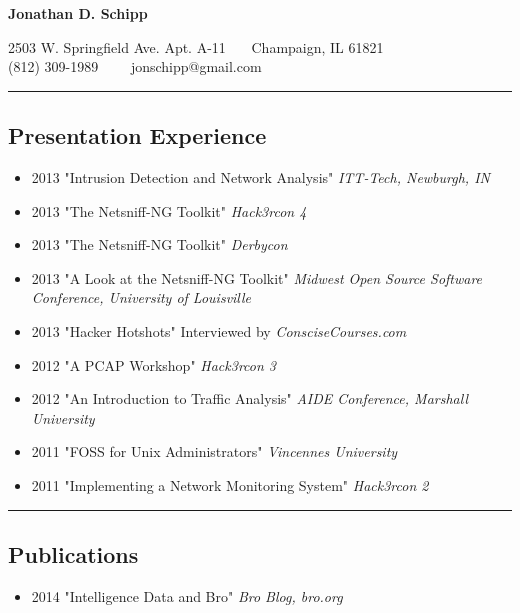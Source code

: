 \documentclass[10pt,letterpaper]{article}
\begin{document}
\newpage

\begin{center}
{\LARGE \textbf{Jonathan D. Schipp}}

2503 W. Springfield Ave. Apt. A-11\ \textbullet
\ \ Champaign, IL 61821
\\
(812) 309-1989\ \ \textbullet
\ \ jonschipp@gmail.com
\end{center}

\hrule
\vspace{-0.4em}
\subsection*{Presentation Experience}

\begin{itemize}
	\parskip=0.1em
	\item \textsc{2013} "Intrusion Detection and Network Analysis" \textit{ITT-Tech, Newburgh, IN}
	\item \textsc{2013} "The Netsniff-NG Toolkit" \textit{Hack3rcon 4}
	\item \textsc{2013} "The Netsniff-NG Toolkit" \textit{Derbycon}
	\item \textsc{2013} "A Look at the Netsniff-NG Toolkit" \textit{Midwest Open Source Software Conference, University of Louisville}
	\item \textsc{2013} "Hacker Hotshots" Interviewed by \textit{ConsciseCourses.com}
	\item \textsc{2012} "A PCAP Workshop" \textit{Hack3rcon 3}
	\item \textsc{2012} "An Introduction to Traffic Analysis" \textit{AIDE Conference, Marshall University}
	\item \textsc{2011} "FOSS for Unix Administrators" \textit{Vincennes University}
	\item \textsc{2011} "Implementing a Network Monitoring System" \textit{Hack3rcon 2}

\end{itemize}

\hrule
\vspace{-0.4em}
\subsection*{Publications}
\begin{itemize}
	\parskip=0.1em
	\item \textsc{2014} "Intelligence Data and Bro" \textit{Bro Blog, bro.org}
\end{itemize}
\end{document}
